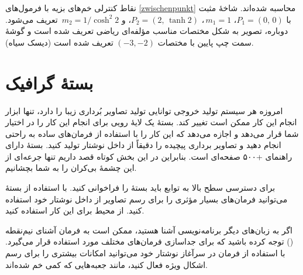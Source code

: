 نقاط کنترلی خم‌های بزیه با فرمول‌های 
\eqref{zwischenpunkt} محاسبه شده‌اند.
شاخهٔ مثبت با $P_1=(0,\,0)$، $\,m_1=1$،  $P_2=(2,\,\tanh 2)$، و $\,m_2=1/\cosh^2 2$ تعریف می‌شود. 
دوباره، تصویر به شکل مختصات مناسب مؤلفه‌ای ریاضی تعریف شده است و گوشهٔ سمت چپ پایین با مختصات 
 $(-3,-2)$ تعریف شده است 
 (دیسک سیاه).

 
\section{بستهٔ گرافیک }

امروزه هر سیستم تولید خروجی \lr{\LaTeX{}} توانایی تولید تصاویر بُرداری زیبا را دارد، تنها ابزار انجام این کار ممکن است تغییر کند. بستهٔ 
یک لایهٔ رویی برای انجام این کار را در اختیار شما قرار می‌دهد و اجازه می‌دهد که این کار را با استفاده از فرمان‌های ساده به راحتی انجام دهید
 و تصاویر برداری پیچیده را دقیقاً از داخل نوشتار تولید کنید. بستهٔ  دارای راهنمای +۵۰۰ صفحه‌ای است\cite{pgfplots}. 
بنابراین  در این بخش کوتاه قصد داریم تنها جرعه‌ای از این چشمهٔ بی‌کران را به شما بچشانیم.

برای دسترسی سطح بالا به توابع  باید بستهٔ  را فراخوانی کنید. با استفاده از بستهٔ  می‌توانید فرمان‌های بسیار مؤثری را برای 
رسم تصاویر از داخل نوشتار خود استفاده کنید. از محیط  برای این کار استفاده کنید.

\begin{example}
\end{example}
اگر به زبان‌های دیگر برنامه‌نویسی آشنا هستید، ممکن است به فرمان آشنای نیم‌نقطه (\lr{\texttt{;}}) توجه کرده باشید که 
برای جداسازی فرمان‌های مختلف مورد استفاده قرار می‌گیرد. با استفاده از فرمان  در سرآغاز نوشتار خود 
می‌توانید امکانات بیشتری را برای رسم اشکال ویژه فعال کنید، مانند جعبه‌هایی که کمی خم شده‌اند.
\begin{example}
\usetikzlibrary{%
  decorations.pathmorphing}
\end{example}

